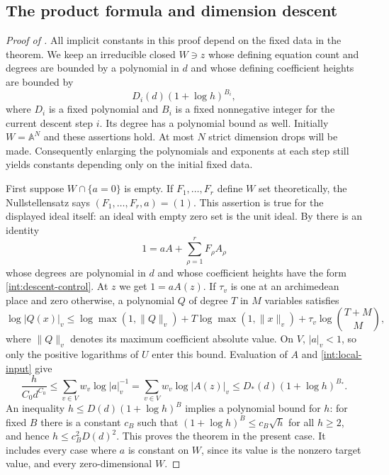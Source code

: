 \subsection{The product formula and dimension descent}

\begin{proof}[Proof of ]
All implicit constants in this proof depend on the fixed data in the
theorem.  We keep an irreducible closed $W\ni z$ whose defining
equation count and degrees are bounded by a polynomial in $d$ and
whose defining coefficient heights are bounded by
\begin{equation}\label{int:descent-control}
 D_i(d)(1+\log h)^{B_i},
\end{equation}
where $D_i$ is a fixed polynomial and $B_i$ is a fixed nonnegative
integer for the current descent step $i$.  Its degree has a polynomial
bound as well.  Initially $W=\mathbb A^N$ and these assertions hold.
At most $N$ strict dimension drops will be made.  Consequently
enlarging the polynomials and exponents at each step still yields
constants depending only on the initial fixed data.

First suppose $W\cap\{a=0\}$ is empty.  If $F_1,\ldots,F_r$ define
$W$ set theoretically, the Nullstellensatz says
$(F_1,\ldots,F_r,a)=(1)$.  This assertion is true for the displayed
ideal itself: an ideal with empty zero set is the unit ideal.
By  there is an identity
\[
 1=aA+\sum_{\rho=1}^r F_\rho A_\rho
\]
whose degrees are polynomial in $d$ and whose coefficient heights
have the form \eqref{int:descent-control}.  At $z$ we get $1=aA(z)$.
If $\tau_v$ is one at an archimedean place and zero otherwise, a
polynomial $Q$ of degree $T$ in $M$ variables satisfies
\begin{equation}\label{int:evaluation}
 \log|Q(x)|_v
  \leq \log\max(1,\|Q\|_v)
       +T\log\max(1,\|x\|_v)
       +\tau_v\log\binom{T+M}{M},
\end{equation}
where $\|Q\|_v$ denotes its maximum coefficient absolute value.
On $V$, $|a|_v<1$, so only the positive logarithms of $U$ enter this
bound.  Evaluation of $A$ and \eqref{int:local-input} give
\[
 \frac{h}{C_0d^{C_0}}
 \leq\sum_{v\in V}w_v\log|a|_v^{-1}
 =\sum_{v\in V}w_v\log|A(z)|_v
 \leq D_*(d)(1+\log h)^{B_*}.
\]
An inequality $h\leq D(d)(1+\log h)^B$ implies a polynomial bound
for $h$: for fixed $B$ there is a constant $c_B$ such that
$(1+\log h)^B\leq c_B\sqrt h$ for all $h\geq2$, and hence
$h\leq c_B^2D(d)^2$.  This proves the theorem in the present case.
It includes every case where $a$ is constant on $W$, since its value
is the nonzero target value, and every zero-dimensional $W$.


\end{proof}
